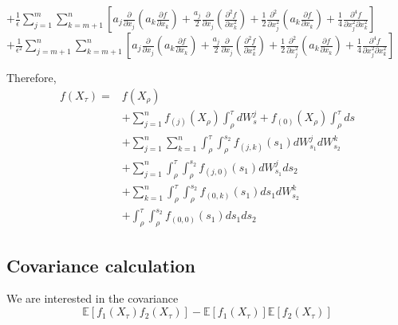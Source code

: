 \documentclass[12pt]{article}
\begin{document}
\begin{itemize}
$+ \frac{1}{\epsilon} \sum_{j=1}^m \sum_{k= m+1}^n \left[ a_j \frac{\partial}{\partial x_j} \left( a_k \frac{\partial f}{\partial x_k} \right) + \frac{a_j}{2} \frac{\partial}{\partial x_j} \left( \frac{\partial^2 f}{\partial x_k^2} \right) + \frac{1}{2} \frac{\partial^2}{\partial x_j^2} \left( a_k \frac{\partial f}{\partial x_k} \right) + \frac{1}{4} \frac{\partial^4 f}{\partial x_j^2 \partial x_k^2} \right] $\\
$+ \frac{1}{\epsilon^2} \sum_{j=m+1}^n \sum_{k=m+1}^n \left[ a_j \frac{\partial}{\partial x_j} \left( a_k \frac{\partial f}{\partial x_k} \right) + \frac{a_j}{2} \frac{\partial}{\partial x_j} \left( \frac{\partial^2 f}{\partial x_k^2} \right) + \frac{1}{2} \frac{\partial^2}{\partial x_j^2} \left( a_k \frac{\partial f}{\partial x_k} \right) + \frac{1}{4} \frac{\partial^4 f}{\partial x_j^2 \partial x_k^2} \right]  $
\end{itemize}

Therefore, 
\begin{equation} 
\begin{aligned}
f( X_\tau) =& f(X_\rho) \\
& + \sum_{j=1}^n f_{(j)} (X_\rho) \int_\rho^\tau dW_s^j 
  + f_{(0)} (X_\rho) \int_\rho^\tau ds \\
& + \sum_{j=1}^n \sum_{k=1}^n \int_\rho^\tau \int_\rho^{s_2} f_{(j,k)} (s_1) dW_{s_1}^j dW_{s_2}^k \\
& + \sum_{j=1}^n \int_\rho^\tau \int_\rho^{s_2} f_{(j,0)} (s_1) dW_{s_1}^j ds_2 \\
& + \sum_{k=1}^n \int_\rho^\tau \int_\rho^{s_2} f_{(0,k)} (s_1) ds_1 dW_{s_2}^k \\
& + \int_\rho^\tau \int_\rho^{s_2} f_{(0,0)} (s_1) ds_1 ds_2 
\end{aligned}
\end{equation}

\subsection{Covariance calculation}

We are interested in the covariance
\begin{equation}
\mathbb{E}\left[ f_1(X_\tau) f_2(X_\tau) \right] - \mathbb{E}\left[ f_1(X_\tau) \right] \mathbb{E}\left[ f_2(X_\tau) \right]  
\end{equation}
\end{document}
